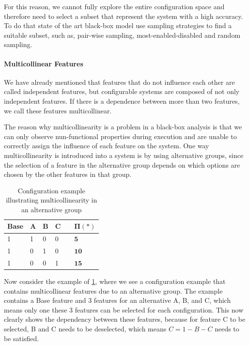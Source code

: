 For this reason, we cannot fully explore the entire configuration space 
and therefore need to select a subset that represent the system with a high accuracy. To do that state of the art black-box model use sampling
strategies to find a suitable subset, such as, pair-wise sampling, most-enabled-disabled and random sampling.

\paragraph{Multicollinear Features}\label{ColinearF}
We have already mentioned that features that do not influence each other are called independent features, but configurable systems are composed
of not only independent features. If there is a dependence between more than two features, we call these features multicollinear.

The reason why multicollinearity is a problem in a black-box analysis is
that we can only observe nun-functional properties during execution and are unable to correctly assign the influence of each feature
on the system. One way multicollinearity is introduced into a system is by using alternative groups, since the selection of a feature in the
alternative group depends on which options are chosen by the other features in that group. \cite{Multicollinearity}
\pagebreak

\begin{table}[h]
    \centering
    \begin{tabular}{llllll}
    \hline
    Base & A & B & C &  & $\bm{\Pi(*)}$ \\ \hline
    1 & 1 & 0 & 0 &  & $\mathbf{5}$  \\
    1 & 0 & 1 & 0 &  & $\mathbf{10}$  \\  
    1 & 0 & 0 & 1 &  & $\mathbf{15}$  \\\hline
    \end{tabular}  
    \caption{Configuration example illustrating multicollinearity in an alternative group}\label{tab:alternative}
\end{table}

Now consider the example of \ref{tab:alternative}, where we see a configuration example that contains multicollinear features due to an alternative group.
The example contains a Base feature and 3 features for an alternative A, B, and C, which means only one these 3 features can be selected for each
configuration.
This now clearly shows the dependency between these features, because for feature C to be selected, B and C needs to be deselected, which means
$C = 1 - B - C$ needs to be satisfied. 

